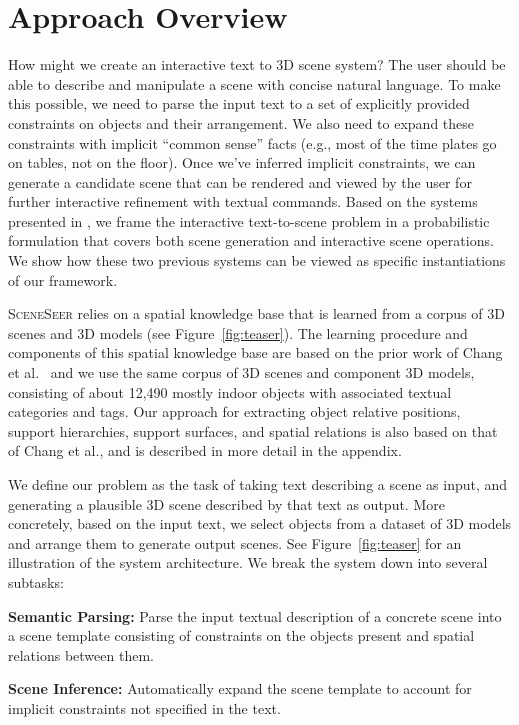 \documentclass{sigchi}
\newcommand{\SceneSeer}{\textsc{SceneSeer}\xspace}
\begin{document}
\section{Approach Overview}

How might we create an interactive text to 3D scene system?  The user should be able to describe and manipulate a scene with concise natural language.  To make this possible, we need to parse the input text to a set of explicitly provided constraints on objects and their arrangement.  We also need to expand these constraints with implicit ``common sense'' facts (e.g., most of the time plates go on tables, not on the floor).  Once we've inferred implicit constraints, we can generate a candidate scene that can be rendered and viewed by the user for further interactive refinement with textual commands.  Based on the systems presented in \cite{chang2014interactive,chang2014spatial}, we frame the interactive text-to-scene problem in a probabilistic formulation that covers both scene generation and interactive scene operations. We show how these two previous systems can be viewed as specific instantiations of our framework.

\SceneSeer relies on a spatial knowledge base that is learned from a corpus of 3D scenes and 3D models (see Figure~\ref{fig:teaser}).  The learning procedure and components of this spatial knowledge base are based on the prior work of Chang et al.~\cite{chang2014spatial} and we use the same corpus of 3D scenes and component 3D models, consisting of about 12,490 mostly indoor objects with associated textual categories and tags.  Our approach for extracting object relative positions, support hierarchies, support surfaces, and spatial relations is also based on that of Chang et al., and is described in more detail in the appendix.

We define our problem as the task of taking text describing a scene as input, and generating a plausible 3D scene described by that text as output.  More concretely, based on the input text, we select objects from a dataset of 3D models and arrange them to generate output scenes.  See Figure~\ref{fig:teaser} for an illustration of the system architecture. We break the system down into several subtasks:

\textbf{Semantic Parsing:} Parse the input textual description of a concrete scene into a scene template consisting of constraints on the objects present and spatial relations between them.

\textbf{Scene Inference:} Automatically expand the scene template to account for implicit constraints not specified in the text.
\end{document}
